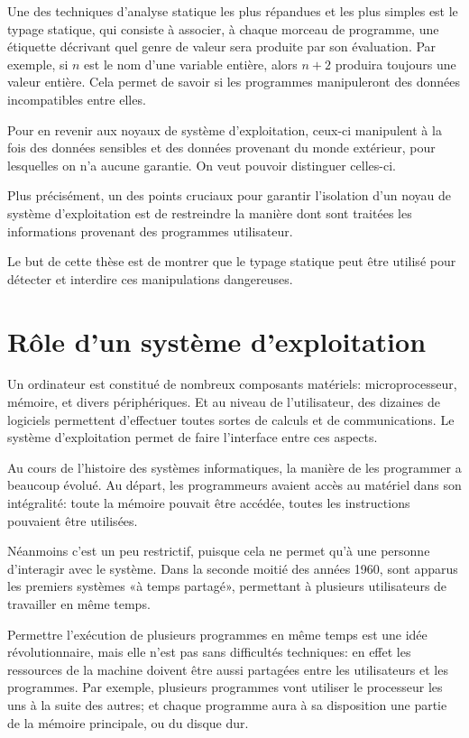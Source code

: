 Une des techniques d'analyse statique les plus répandues et les plus simples est
le typage statique, qui consiste à associer, à chaque morceau de programme, une
étiquette décrivant quel genre de valeur sera produite par son évaluation. Par
exemple, si $n$ est le nom d'une variable entière, alors $n + 2$ produira
toujours une valeur entière.
Cela permet de savoir si les programmes manipuleront des données incompatibles
entre elles.

Pour en revenir aux noyaux de système d'exploitation, ceux-ci manipulent à la
fois des données sensibles et des données provenant du monde extérieur, pour
lesquelles on n'a aucune garantie. On veut pouvoir distinguer celles-ci.

Plus précisément, un des points cruciaux pour garantir l'isolation d'un noyau de
système d'exploitation est de restreindre la manière dont sont traitées les
informations provenant des programmes utilisateur.

Le but de cette thèse est de montrer que le typage statique peut être utilisé
pour détecter et interdire ces manipulations dangereuses.

\section{Rôle d'un système d'exploitation}

Un ordinateur est constitué de nombreux composants matériels: microprocesseur,
mémoire, et divers périphériques. Et au niveau de l'utilisateur, des dizaines de
logiciels permettent d'effectuer toutes sortes de calculs et de communications.
Le système d'exploitation permet de faire l'interface entre ces aspects.

Au cours de l'histoire des systèmes informatiques, la manière de les programmer
a beaucoup évolué. Au départ, les programmeurs avaient accès au matériel dans
son intégralité: toute la mémoire pouvait être accédée, toutes les instructions
pouvaient être utilisées.

Néanmoins c'est un peu restrictif, puisque cela ne permet qu'à une personne
d'interagir avec le système. Dans la seconde moitié des années 1960, sont
apparus les premiers systèmes «à temps partagé», permettant à plusieurs
utilisateurs de travailler en même temps.

Permettre l'exécution de plusieurs programmes en même temps est une idée
révolutionnaire, mais elle n'est pas sans difficultés techniques: en effet les
ressources de la machine doivent être aussi partagées entre les utilisateurs et
les programmes. Par exemple, plusieurs programmes vont utiliser le processeur
les uns à la suite des autres; et chaque programme aura à sa disposition une
partie de la mémoire principale, ou du disque dur.

